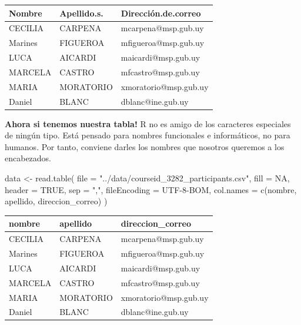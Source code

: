 \documentclass[
  letterpaper,
  DIV=11,
  numbers=noendperiod]{scrreprt}
\newenvironment{Shaded}{\begin{snugshade}}{\end{snugshade}}
\newcommand{\AttributeTok}[1]{\textcolor[rgb]{0.40,0.45,0.13}{#1}}
\newcommand{\ConstantTok}[1]{\textcolor[rgb]{0.56,0.35,0.01}{#1}}
\newcommand{\FunctionTok}[1]{\textcolor[rgb]{0.28,0.35,0.67}{#1}}
\newcommand{\NormalTok}[1]{\textcolor[rgb]{0.00,0.23,0.31}{#1}}
\newcommand{\OtherTok}[1]{\textcolor[rgb]{0.00,0.23,0.31}{#1}}
\newcommand{\StringTok}[1]{\textcolor[rgb]{0.13,0.47,0.30}{#1}}
\begin{document}
\begin{longtable}[]{@{}lll@{}}
\toprule()
Nombre & Apellido.s. & Dirección.de.correo \\
\midrule()
\endhead
CECILIA & CARPENA & mcarpena@msp.gub.uy \\
Marines & FIGUEROA & mfigueroa@msp.gub.uy \\
LUCA & AICARDI & maicardi@msp.gub.uy \\
MARCELA & CASTRO & mfcastro@msp.gub.uy \\
MARIA & MORATORIO & xmoratorio@msp.gub.uy \\
Daniel & BLANC & dblanc@ine.gub.uy \\
\bottomrule()
\end{longtable}

\textbf{Ahora si tenemos nuestra tabla!} R no es amigo de los caracteres
especiales de ningún tipo. Está pensado para nombres funcionales e
informáticos, no para humanos. Por tanto, conviene darles los nombres
que nosotros queremos a los encabezados.

\begin{Shaded}
\begin{Highlighting}[]
\NormalTok{data }\OtherTok{\textless{}{-}} \FunctionTok{read.table}\NormalTok{(}
  \AttributeTok{file =} \StringTok{"../data/courseid\_3282\_participants.csv"}\NormalTok{, }
  \AttributeTok{fill =} \ConstantTok{NA}\NormalTok{,}
  \AttributeTok{header =} \ConstantTok{TRUE}\NormalTok{,}
  \AttributeTok{sep =} \StringTok{","}\NormalTok{,}
  \AttributeTok{fileEncoding =} \StringTok{\textquotesingle{}UTF{-}8{-}BOM\textquotesingle{}}\NormalTok{,}
  \AttributeTok{col.names =} \FunctionTok{c}\NormalTok{(}\StringTok{\textquotesingle{}nombre\textquotesingle{}}\NormalTok{, }\StringTok{\textquotesingle{}apellido\textquotesingle{}}\NormalTok{, }\StringTok{\textquotesingle{}direccion\_correo\textquotesingle{}}\NormalTok{)}
\NormalTok{)}
\end{Highlighting}
\end{Shaded}

\begin{longtable}[]{@{}lll@{}}
\toprule()
nombre & apellido & direccion\_correo \\
\midrule()
\endhead
CECILIA & CARPENA & mcarpena@msp.gub.uy \\
Marines & FIGUEROA & mfigueroa@msp.gub.uy \\
LUCA & AICARDI & maicardi@msp.gub.uy \\
MARCELA & CASTRO & mfcastro@msp.gub.uy \\
MARIA & MORATORIO & xmoratorio@msp.gub.uy \\
Daniel & BLANC & dblanc@ine.gub.uy \\
\bottomrule()
\end{longtable}
\end{document}
